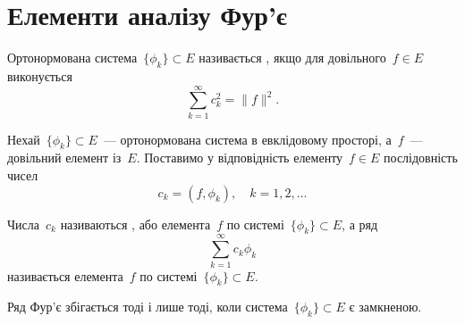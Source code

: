 \section{Елементи аналізу Фур'є}

\begin{definition}
Ортонормована система~$\{\phi_k\} \subset E$
називається , якщо для довільного~$f \in E$
виконується 
\begin{equation}
    \sum_{k = 1}^\infty c_k^2 = \|f\|^2.
\end{equation}
\end{definition}

\begin{definition}
Нехай~$\{\phi_k\} \subset E$~--- ортонормована система в
евклідовому просторі, а~$f$~--- довільний елемент із~$E$.
Поставимо у відповідність елементу~$f \in E$ послідовність
чисел
\begin{equation*}
    c_k = (f, \phi_k), \quad k = 1, 2, \dots
\end{equation*}

Числа~$c_k$ називаються , або  елемента~$f$ по системі~$\{\phi_k\} \subset E$, а ряд
\begin{equation*}
    \sum_{k = 1}^\infty c_k \phi_k
\end{equation*}
називається  елемента~$f$ по системі~$\{\phi_k\} \subset E$.
\end{definition}

\begin{theorem}
Ряд Фур’є збігається тоді і лише тоді,
коли система~$\{\phi_k\} \subset E$ є замкненою.
\end{theorem}

